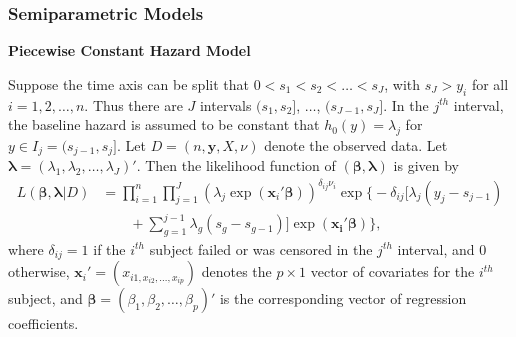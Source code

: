 \documentclass{beamer}
\begin{document}
	\begin{frame}
		\frametitle{Semiparametric Models}
		\textbf{Piecewise Constant Hazard Model}
		
		Suppose the time axis can be split that $0 < s_1 < s_2 < \dots < s_J$, with $s_J > y_i$ for all $i = 1, 2, \dots, n$. Thus there are $J$ intervals $(s_1, s_2]$, $\dots$, $(s_{J - 1}, s_J]$. In the $j ^ {th}$ interval, the baseline hazard is assumed to be constant that $h_0(y) = \lambda_j$ for $y \in I_j = (s_{j - 1}, s_j]$. Let $D = (n, \boldsymbol{y}, X, \nu)$ denote the observed data. Let $\boldsymbol{\lambda} = (\lambda_1, \lambda_2, \dots, \lambda_J)'$. Then the likelihood function of $(\boldsymbol{\beta},\boldsymbol{\lambda})$ is given by
		\begin{equation*}
			\begin{split}
				L(\boldsymbol{\beta}, \boldsymbol{\lambda} | D) & = \prod_{i = 1}^{n}\prod_{j = 1}^{J}(\lambda_j\exp(\boldsymbol{x}_i'\boldsymbol{\beta})) ^ {\delta_{ij}\nu_i}\exp\bigg\{-\delta_{ij}[\lambda_j(y_j - s_{j - 1})\\
				& \quad\quad + \sum_{g = 1}^{j - 1}\lambda_g(s_g - s_{g - 1})]\exp(\boldsymbol{x_i}'\boldsymbol{\beta})\bigg\},
			\end{split}
		\end{equation*}
		where $\delta_{ij} = 1$ if the $i ^ {th}$ subject failed or was censored in the $j ^ {th}$ interval, and $0$ otherwise, $\boldsymbol{x}_i' = (x_{i1, x_{i2}, \dots, x_{ip}})$ denotes the $p\times1$ vector of covariates for the $i ^ {th}$ subject, and $\boldsymbol{\beta} = (\beta_1, \beta_2, \dots, \beta_p)'$ is the corresponding vector of regression coefficients.
	\end{frame}
	\begin{frame}[allowframebreaks]
		\begin{singlespace}
			
			
		\end{singlespace}
	\end{frame}
	
\end{document}
